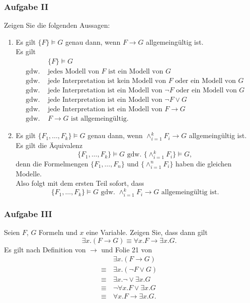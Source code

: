 \subsubsection*{Aufgabe II}
Zeigen Sie die folgenden Aussagen: 
\begin{enumerate}
	\item Es gilt $\{F\} \models G$ genau dann, wenn $F \to G$ allgemeingültig ist.\\
	\LOES Es gilt 
	\begin{align*}
	&\{F\} \models G \\
	\text{gdw. } &\text{jedes Modell von } F \text{ ist ein Modell von } G \\
	\text{gdw. } &\text{jede Interpretation ist kein Modell von } F \text{ oder ein Modell von } G \\
	\text{gdw. } &\text{jede Interpretation ist ein Modell von } \lnot F \text{ oder ein Modell von } G \\
	\text{gdw. } &\text{jede Interpretation ist ein Modell von } \lnot F \lor G  \\
	\text{gdw. } &\text{jede Interpretation ist ein Modell von } F \to G \\
	\text{gdw. } & F \to G \text{ ist allgemeingültig. }
	\end{align*}
	\item Es gilt $\{F_1,\dots,F_k\} \models G$ genau dann, wenn $\land_{i=1}^k F_i \to G$ allgemeingültig ist. \\
	\LOES Es gilt die Äquivalenz
	\begin{equation*}
	\{F_1, \dots ,F_k\} \models G \text{ gdw. } \{\land_{i=1}^k F_i\} \models G,
	\end{equation*}
	denn die Formelmengen $\{F_1,\dots ,F_n \}$ und $\{ \land_{i=1}^n F_i \}$ haben die gleichen Modelle. \\
	Also folgt mit dem ersten Teil sofort, dass 
	\begin{equation*}
	\{ F_1, \dots , F_k \} \models G \text{ gdw. } \land_{i=1}^k F_i \to G \text{ allgemeingültig ist.}
	\end{equation*}
\end{enumerate}

\subsubsection*{Aufgabe III}
Seien $F$, $G$ Formeln und $x$ eine Variable. Zeigen Sie, dass dann gilt 
\begin{equation*}
\exists x.(F \to G) \equiv \forall x. F \to \exists x. G.
\end{equation*}
\LOES Es gilt nach Definition von $\to$ und Folie 21 von 
\begin{align*}
& \exists x.(F \to G) \\
\equiv \,& \exists x.(\lnot F \lor G) \\
\equiv \,& \exists x.\lnot \lor \exists x.G \\
\equiv \,& \lnot \forall x.F \lor \exists x.G \\
\equiv \,& \forall x.F \to \exists x.G.
\end{align*}

